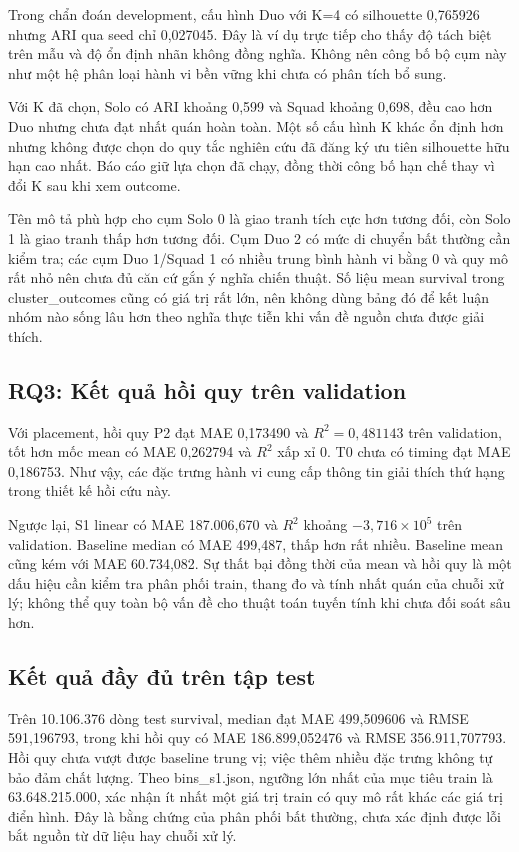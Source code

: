 \documentclass[12pt,a4paper]{article}
\begin{document}
Trong chẩn đoán development, cấu hình Duo với K=4 có silhouette 0,765926 nhưng ARI qua seed chỉ 0,027045. Đây là ví dụ trực tiếp cho thấy độ tách biệt trên mẫu và độ ổn định nhãn không đồng nghĩa. Không nên công bố bộ cụm này như một hệ phân loại hành vi bền vững khi chưa có phân tích bổ sung.

Với K đã chọn, Solo có ARI khoảng 0,599 và Squad khoảng 0,698, đều cao hơn Duo nhưng chưa đạt nhất quán hoàn toàn. Một số cấu hình K khác ổn định hơn nhưng không được chọn do quy tắc nghiên cứu đã đăng ký ưu tiên silhouette hữu hạn cao nhất. Báo cáo giữ lựa chọn đã chạy, đồng thời công bố hạn chế thay vì đổi K sau khi xem outcome.

Tên mô tả phù hợp cho cụm Solo 0 là giao tranh tích cực hơn tương đối, còn Solo 1 là giao tranh thấp hơn tương đối. Cụm Duo 2 có mức di chuyển bất thường cần kiểm tra; các cụm Duo 1/Squad 1 có nhiều trung bình hành vi bằng 0 và quy mô rất nhỏ nên chưa đủ căn cứ gắn ý nghĩa chiến thuật. Số liệu mean survival trong cluster\_outcomes cũng có giá trị rất lớn, nên không dùng bảng đó để kết luận nhóm nào sống lâu hơn theo nghĩa thực tiễn khi vấn đề nguồn chưa được giải thích.

\subsection{RQ3: Kết quả hồi quy trên validation}

Với placement, hồi quy P2 đạt MAE 0,173490 và $R^2=0,481143$ trên validation, tốt hơn mốc mean có MAE 0,262794 và $R^2$ xấp xỉ 0. T0 chưa có timing đạt MAE 0,186753. Như vậy, các đặc trưng hành vi cung cấp thông tin giải thích thứ hạng trong thiết kế hồi cứu này.

Ngược lại, S1 linear có MAE 187.006,670 và $R^2$ khoảng $-3,716\times10^5$ trên validation. Baseline median có MAE 499,487, thấp hơn rất nhiều. Baseline mean cũng kém với MAE 60.734,082. Sự thất bại đồng thời của mean và hồi quy là một dấu hiệu cần kiểm tra phân phối train, thang đo và tính nhất quán của chuỗi xử lý; không thể quy toàn bộ vấn đề cho thuật toán tuyến tính khi chưa đối soát sâu hơn.
\subsection{Kết quả đầy đủ trên tập test}

Trên 10.106.376 dòng test survival, median đạt MAE 499,509606 và RMSE 591,196793, trong khi hồi quy có MAE 186.899,052476 và RMSE 356.911,707793. Hồi quy chưa vượt được baseline trung vị; việc thêm nhiều đặc trưng không tự bảo đảm chất lượng. Theo bins\_s1.json, ngưỡng lớn nhất của mục tiêu train là 63.648.215.000, xác nhận ít nhất một giá trị train có quy mô rất khác các giá trị điển hình. Đây là bằng chứng của phân phối bất thường, chưa xác định được lỗi bắt nguồn từ dữ liệu hay chuỗi xử lý.
\end{document}
